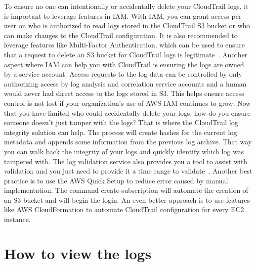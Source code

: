 To ensure no one can intentionally or accidentally delete your CloudTrail logs, it is important to leverage features in IAM. With IAM, you can grant access per user on who is authorized to read logs stored in the CloudTrail S3 bucket or who can make changes to the CloudTrail configuration. It is also recommended to leverage features like Multi-Factor Authentication, which can be used to ensure that a request to delete an S3 bucket for CloudTrail logs is legitimate~\cite{hid-sp18-518-CloudTrail-user-guide}. 
Another aspect where IAM can help you with CloudTrail is ensuring the logs are owned by a service account. Access requests to the log data can be controlled by only authorizing access by log analysis and correlation service accounts and a human would never had direct access to the logs stored in S3. This helps ensure access control is not lost if your organization’s use of AWS IAM continues to grow. 
Now that you have limited who could accidentally delete your logs, how do you ensure someone doesn’t just tamper with the logs? That is where the CloudTrail log integrity solution can help. The process will create hashes for the current log metadata and appends some information from the previous log archive. That way you can walk back the integrity of your logs and quickly identify which log was tampered with. The log validation service also provides you a tool to assist with validation and you just need to provide it a time range to validate~\cite{hid-sp18-518-CloudTrail-user-guide}.
Another best practice is to use the AWS Quick Setup to reduce error caused by manual implementation. The command create-subscription will automate the creation of an S3 bucket and will begin the login. An even better approach is to use features like AWS CloudFormation to automate CloudTrail configuration for every EC2 instance.

\section{How to view the logs}

